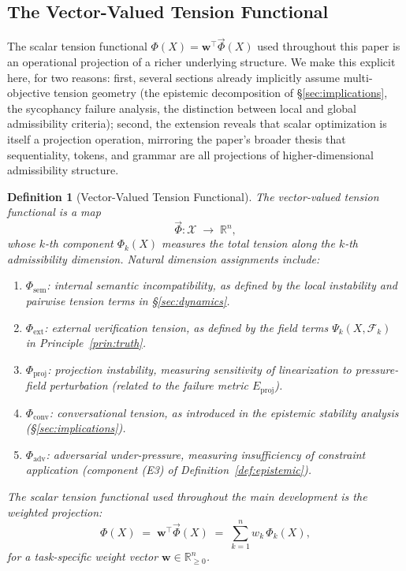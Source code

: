 \documentclass[11pt, a4paper]{article}
\theoremstyle{srn}
\newtheorem{definition}{Definition}[section]
\theoremstyle{srnremark}
\newcommand{\Phiten}{\varPhi}            %
\begin{document}
\subsection{The Vector-Valued Tension Functional}

The scalar tension functional $\Phiten(X) = \mathbf{w}^\top
\vec{\Phiten}(X)$ used throughout this paper is an operational
projection of a richer underlying structure.
We make this explicit here, for two reasons: first, several sections
already implicitly assume multi-objective tension geometry
(the epistemic decomposition of §\ref{sec:implications}, the
sycophancy failure analysis, the distinction between local and
global admissibility criteria); second, the extension reveals that
scalar optimization is itself a projection operation, mirroring the
paper's broader thesis that sequentiality, tokens, and grammar are
all projections of higher-dimensional admissibility structure.

\begin{definition}[Vector-Valued Tension Functional]
\label{def:vecphi}
The \emph{vector-valued tension functional} is a map
\[
  \vec{\Phiten} : \mathcal{X} \;\longrightarrow\; \mathbb{R}^n,
\]
whose $k$-th component $\Phiten_k(X)$ measures the total tension
along the $k$-th admissibility dimension.
Natural dimension assignments include:
\begin{enumerate}
  \item[(V1)] $\Phiten_{\mathrm{sem}}$: internal semantic
    incompatibility, as defined by the local instability and pairwise
    tension terms in §\ref{sec:dynamics}.
  \item[(V2)] $\Phiten_{\mathrm{ext}}$: external verification
    tension, as defined by the field terms $\Psi_k(X,
    \mathcal{F}_k)$ in Principle~\ref{prin:truth}.
  \item[(V3)] $\Phiten_{\mathrm{proj}}$: projection instability,
    measuring sensitivity of linearization to pressure-field
    perturbation (related to the failure metric $E_{\mathrm{proj}}$).
  \item[(V4)] $\Phiten_{\mathrm{conv}}$: conversational tension,
    as introduced in the epistemic stability analysis
    (§\ref{sec:implications}).
  \item[(V5)] $\Phiten_{\mathrm{adv}}$: adversarial
    under-pressure, measuring insufficiency of constraint application
    (component (E3) of Definition~\ref{def:epistemic}).
\end{enumerate}
The scalar tension functional used throughout the main development
is the weighted projection:
\begin{equation}
  \label{eq:scalar_proj}
  \Phiten(X) \;=\; \mathbf{w}^\top \vec{\Phiten}(X)
  \;=\; \sum_{k=1}^n w_k\, \Phiten_k(X),
\end{equation}
for a task-specific weight vector $\mathbf{w} \in \mathbb{R}^n_{\geq 0}$.
\end{definition}
\end{document}
